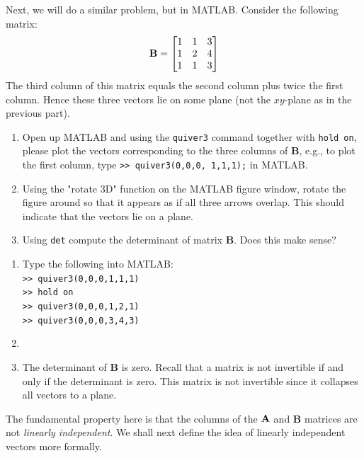 \begin{prob}
Next, we will do a similar problem, but in MATLAB. Consider the following matrix:
\begin{align}
\mathbf{B} = \begin{bmatrix} 1 & 1 & 3 \\ 1 & 2 & 4 \\ 1 & 1 & 3 \end{bmatrix}
\end{align}
The third column of this matrix equals the second column plus twice the first column.  Hence these three vectors lie on some plane (not the $xy$-plane as in the previous part).
\begin{enumerate}
\item Open up MATLAB and using the \texttt{quiver3} command together with \texttt{hold on}, please plot the vectors corresponding to the three columns of $\mathbf{B}$, e.g., to plot the first column, type \texttt{>> quiver3(0,0,0, 1,1,1);} in MATLAB.
\item  Using the "rotate 3D" function on the MATLAB figure window, rotate the figure around so that it appears as if all three arrows overlap. This should indicate that the vectors lie on a plane.
\item Using \texttt{det} compute the determinant of matrix $\mathbf{B}$. Does this make sense?
\end{enumerate}
\end{prob}
\begin{sol}
	\begin{enumerate}
		\item Type the following into MATLAB:\\
		\texttt{>> quiver3(0,0,0,1,1,1)}\\
		\texttt{>> hold on}\\
		\texttt{>> quiver3(0,0,0,1,2,1)}\\
		\texttt{>> quiver3(0,0,0,3,4,3)}
		\item 
		\item The determinant of $\mathbf{B}$ is zero. Recall that a matrix is not invertible if and only if the determinant is zero. This matrix is not invertible since it collapses all vectors to a plane.
	\end{enumerate}
\end{sol}

The fundamental property here is that the columns of the $\mathbf{A}$ and $\mathbf{B}$ matrices are not \emph{linearly independent}. We shall next define the idea of linearly independent vectors more formally.

